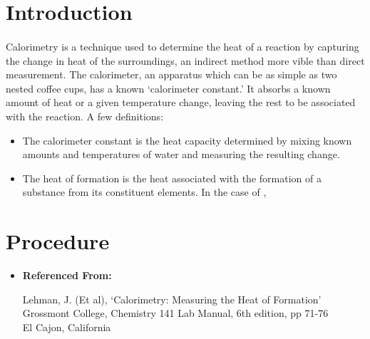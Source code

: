 \documentclass[fleqn,titlepage]{article}
\begin{document}
\section*{Introduction}
  \paragraph{} Calorimetry is a technique used to determine the heat of a reaction by capturing the change in heat of the surroundings, an indirect method more vible than direct measurement. The calorimeter, an apparatus which can be as simple as two nested coffee cups, has a known `calorimeter constant.' It absorbs a known amount of heat or a given temperature change, leaving the rest to be associated with the reaction. A few definitions:
  \begin{itemize}
    \item The  calorimeter constant is the heat capacity determined by mixing known amounts and temperatures of water and measuring the resulting change.
    \item The heat of formation is the heat associated with the formation of a substance from its constituent elements. In the case of , 
  \end{itemize}

\section*{Procedure}
\begin{itemize}
  \item  \textbf{Referenced From:} \\
    \begin{addmargin}[1em]{1em}
      Lehman, J. (Et al), `Calorimetry: Measuring the Heat of Formation' \\
      Grossmont College, Chemistry 141 Lab Manual, 6th edition, pp 71-76 \\
      El Cajon, California
    \end{addmargin}
\end{itemize}

\end{document}
